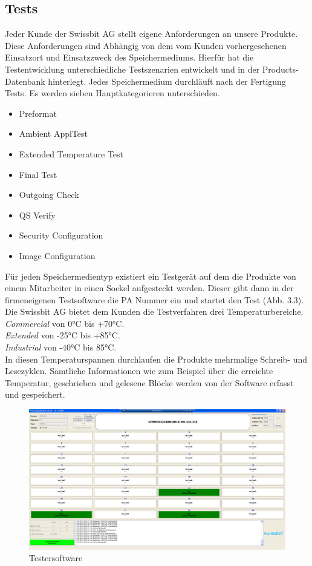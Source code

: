 \subsection{Tests}
Jeder Kunde der Swissbit AG stellt eigene Anforderungen an unsere Produkte. Diese Anforderungen sind Abhängig von dem vom Kunden vorhergesehenen Einsatzort und Einsatzzweck des Speichermediums. Hierfür hat die Testentwicklung unterschiedliche Testszenarien entwickelt und in der Products-Datenbank hinterlegt. Jedes Speichermedium durchläuft nach der Fertigung Tests. Es werden sieben Hauptkategorieren unterschieden.
\begin{itemize}
\item Preformat
\item Ambient ApplTest
\item Extended Temperature Test
\item Final Test
\item Outgoing Check
\item QS Verify
\item Security Configuration
\item Image Configuration
\end{itemize}
Für jeden Speichermedientyp existiert ein Testgerät auf dem die Produkte von einem Mitarbeiter in einen Sockel aufgesteckt werden. Dieser gibt dann in der firmeneigenen Testsoftware die \ac{PA} Nummer ein und startet den Test (Abb. 3.3). Die Swissbit AG bietet dem Kunden die Testverfahren drei Temperaturbereiche. \\
\textit{Commercial} von 0°C bis +70°C. \\
\textit{Extended} von -25°C bis +85°C. \\
\textit{Industrial} von -40°C bis 85°C. \\
In diesen Temperaturspannen durchlaufen die Produkte mehrmalige Schreib- und Lesezyklen. Sämtliche Informationen wie zum Beispiel über die erreichte Temperatur, geschrieben und gelesene Blöcke werden von der Software erfasst und gespeichert. \\
\begin{figure}[!htbp]
\centering
\includegraphics[scale=0.2]{images/testerSoftware}
\caption{Testersoftware}
\label{fig:SD Tester Software}
\end{figure}

